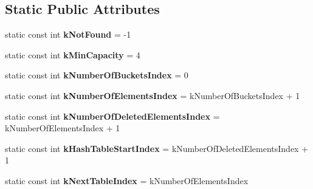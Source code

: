 \subsection*{Static Public Attributes}
\begin{DoxyCompactItemize}
\item 
static const int {\bfseries k\+Not\+Found} = -\/1\hypertarget{classv8_1_1internal_1_1_ordered_hash_table_a67651d10adaf728fab554b061ce94afa}{}\label{classv8_1_1internal_1_1_ordered_hash_table_a67651d10adaf728fab554b061ce94afa}

\item 
static const int {\bfseries k\+Min\+Capacity} = 4\hypertarget{classv8_1_1internal_1_1_ordered_hash_table_aa45a45fb1d31fefba42cab9dc9881dd8}{}\label{classv8_1_1internal_1_1_ordered_hash_table_aa45a45fb1d31fefba42cab9dc9881dd8}

\item 
static const int {\bfseries k\+Number\+Of\+Buckets\+Index} = 0\hypertarget{classv8_1_1internal_1_1_ordered_hash_table_a996dc280a222d2255dc2897cae189102}{}\label{classv8_1_1internal_1_1_ordered_hash_table_a996dc280a222d2255dc2897cae189102}

\item 
static const int {\bfseries k\+Number\+Of\+Elements\+Index} = k\+Number\+Of\+Buckets\+Index + 1\hypertarget{classv8_1_1internal_1_1_ordered_hash_table_a0f763e040d039f992dd476fc488230ca}{}\label{classv8_1_1internal_1_1_ordered_hash_table_a0f763e040d039f992dd476fc488230ca}

\item 
static const int {\bfseries k\+Number\+Of\+Deleted\+Elements\+Index} = k\+Number\+Of\+Elements\+Index + 1\hypertarget{classv8_1_1internal_1_1_ordered_hash_table_abcba107034e09c257d1d1ca144fcf420}{}\label{classv8_1_1internal_1_1_ordered_hash_table_abcba107034e09c257d1d1ca144fcf420}

\item 
static const int {\bfseries k\+Hash\+Table\+Start\+Index} = k\+Number\+Of\+Deleted\+Elements\+Index + 1\hypertarget{classv8_1_1internal_1_1_ordered_hash_table_a3abfdfd1795d19f64efd3e653fafb299}{}\label{classv8_1_1internal_1_1_ordered_hash_table_a3abfdfd1795d19f64efd3e653fafb299}

\item 
static const int {\bfseries k\+Next\+Table\+Index} = k\+Number\+Of\+Elements\+Index\hypertarget{classv8_1_1internal_1_1_ordered_hash_table_af488401157862828d8294a5ea8044051}{}\label{classv8_1_1internal_1_1_ordered_hash_table_af488401157862828d8294a5ea8044051}


\end{DoxyCompactItemize}
